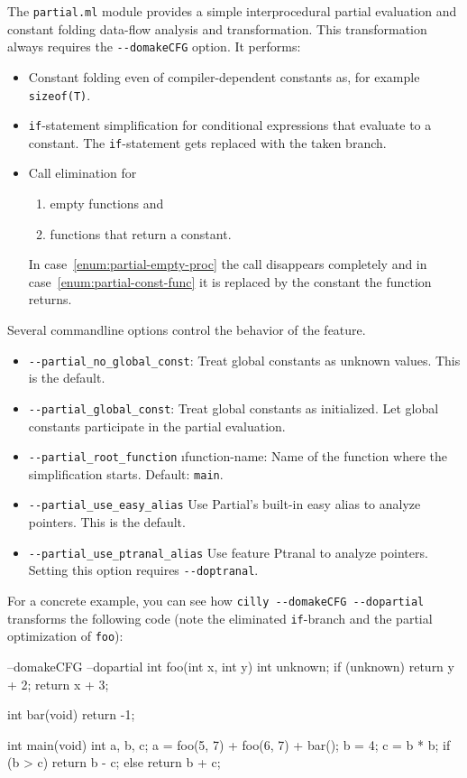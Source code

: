 \documentclass[letterpaper]{article}
\def\t#1{{\tt #1}}
\begin{document}
The \t{partial.ml} module provides a simple interprocedural partial
evaluation and constant folding data-flow analysis and transformation.
This transformation always requires the \t{-{}-domakeCFG} option.  It
performs:
\begin{itemize}
\item Constant folding even of compiler-dependent constants as, for
  example \t{sizeof(T)}.
\item \t{if}-statement simplification for conditional expressions that
  evaluate to a constant.  The \t{if}-statement gets replaced with the
  taken branch.
\item Call elimination for
  \begin{enumerate}
  \item\label{enum:partial-empty-proc} empty functions and
  \item\label{enum:partial-const-func} functions that return a
    constant.
  \end{enumerate}
  In case~\ref{enum:partial-empty-proc} the call disappears completely
  and in case~\ref{enum:partial-const-func} it is replaced by the
  constant the function returns.
\end{itemize}

Several commandline options control the behavior of the feature.
\begin{itemize}
\item \t{-{}-partial\_no\_global\_const}:
 Treat global constants as unknown values.  This is the default.
\item \t{-{}-partial\_global\_const}:
 Treat global constants as initialized.  Let global constants
 participate in the partial evaluation.
\item \t{-{}-partial\_root\_function} \i{function-name}:
  Name of the function where the simplification starts.  Default:
  \t{main}.
\item \t{-{}-partial\_use\_easy\_alias}
  Use Partial's built-in easy alias to analyze pointers.  This is the
  default.
\item \t{-{}-partial\_use\_ptranal\_alias}
  Use feature Ptranal to analyze pointers.  Setting this option
  requires \t{-{}-doptranal}.
\end{itemize}

For a concrete example, you can see how \t{cilly -{}-domakeCFG -{}-dopartial}
transforms the following code (note the eliminated \t{if}-branch and the
partial optimization of \t{foo}):

\begin{cilcode}[global] --domakeCFG --dopartial
  int foo(int x, int y) {
    int unknown;
    if (unknown)
      return y + 2;
    return x + 3;
  }

  int bar(void) {
    return -1;
  }

  int main(void) {
    int a, b, c;
    a = foo(5, 7) + foo(6, 7) + bar();
    b = 4;
    c = b * b;
    if (b > c)
      return b - c;
    else
      return b + c;
  }
\end{cilcode}
\end{document}
